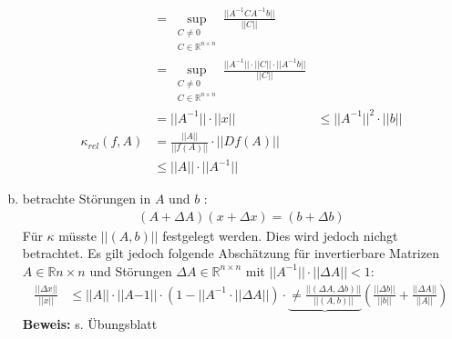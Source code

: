 \documentclass[ngerman,fontsize=11pt, paper=a4, parskip=false, titlepage=false, toc=bib]{scrbook}
\newcommand{\R}{\mathbb{R}}
\begin{document}
\begin{enumerate}[a)]
\begin{align*}
											  &= \sup_{\substack{
																C\neq 0 \\ \nonumber
																C \in \R^{n\times n}														  	
														  	}}
														  \frac{||A^{-1}CA^{-1}b||}{||C||} \\ \nonumber
											  &= \sup_{\substack{
															 	C\neq 0 \\
															 	C \in \R^{n\times n}														  	
															 }}
												 \frac{||A^{-1}||\cdot||C||\cdot||A^{-1}b||}{||C||} \\
											  &= ||A^{-1}|| \cdot||x||
											  &\leq   ||A^{-1}||^2 \cdot||b||\\
				 \kappa_{rel}(f,A)  &= \frac{||A||}{||f(A)||} \cdot ||Df(A)|| \\\nonumber
											 &\leq ||A||\cdot ||A^{-1}|| \label{III.2.10}
			\end{align*}
	 \item betrachte Störungen in $A$ und $b$ :
		 \begin{gather*}
		 	(A+\Delta A)(x+\Delta x) = (b+\Delta b) 
		 \end{gather*}
		 Für $\kappa$ müsste $||(A,b)||$ festgelegt werden. Dies wird jedoch nichgt betrachtet. Es gilt jedoch folgende Abschätzung für invertierbare Matrizen $A\in \R{n\times n} $ und Störungen
		 $\Delta A \in \R^{n\times n}$ mit $||A^{-1}||\cdot ||\Delta A|| < 1$:
		 \begin{align*}
			 \frac{||\Delta x||}{||x||} & \leq ||A|| \cdot ||A{-1}||\cdot (1- ||A^{-1}\cdot ||\Delta A||) 
													 \cdot \underbrace{\neq  \frac{||(\Delta A, \Delta b)||}{||(A,b)||} }{\left(  \frac{||\Delta b||}{||b||} +  \frac{||\Delta A||}{||A||}  \right)}
													 \label{III.2.11}
		 \end{align*}
		 \textbf{Beweis:} s. Übungsblatt
\end{enumerate}
\end{document}
